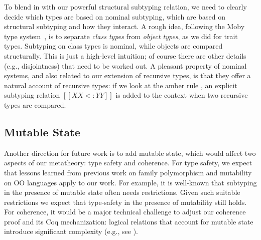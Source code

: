 To blend in with our powerful structural subtyping relation, we need to clearly
decide which types are based on nominal subtyping, which are based on structural
subtyping and how they interact. A rough idea, following the \textsf{Moby} type
system~\citep{fisher2000extending}, is to separate \emph{class types} from
\emph{object types}, as we did for trait types. Subtyping on class types is
nominal, while objects are compared structurally. This is just a high-level
intuition; of course there are other details (e.g., disjointness) that need to
be worked out. A pleasant property of nominal systems, and also related to our
extension of recursive types, is that they offer a natural account of recursive
types: if we look at the amber rule , an explicit subtyping
relation $[[XX <: YY]]$ is added to the context when two recursive types are
compared.



\subsection{Mutable State}

Another direction for future work is to add mutable state, which would affect
two aspects of our metatheory: type safety and coherence. For type safety, we
expect that lessons learned from previous work on family polymorphism and
mutability on OO languages apply to our work. For example, it is well-known that
subtyping in the presence of mutable state often needs restrictions. Given such
suitable restrictions we expect that type-safety in the presence of mutability
still holds. For coherence, it would be a major technical challenge to adjust
our coherence proof and its Coq mechanization: logical relations that account
for mutable state introduce significant complexity (e.g., see
\citet{ahmed2004semantics}).





